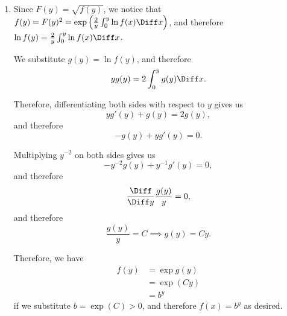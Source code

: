 \begin{enumerate}
    \item Since \(F(y) = \sqrt{f(y)}\), we notice that \(f(y) = F(y)^2 = \exp \left(\frac{2}{y} \int_0^y \ln f(x) \Diff x\right)\), and therefore \(\ln f(y) = \frac{2}{y} \int_0^y \ln f(x) \Diff x\).

          We substitute \(g(y) = \ln f(y)\), and therefore
          \[
              y g(y) = 2 \int_0^y g(y) \Diff x.
          \]

          Therefore, differentiating both sides with respect to \(y\) gives us
          \[
              yg'(y) + g(y) = 2 g(y),
          \]
          and therefore
          \[
              -g(y) + y g'(y) = 0.
          \]

          Multiplying \(y^{-2}\) on both sides gives us
          \[
              -y^{-2}g(y) + y^{-1} g'(y) = 0,
          \]
          and therefore
          \[
              \frac{\Diff}{\Diff y} \frac{g(y)}{y} = 0,
          \]
          and therefore
          \[
              \frac{g(y)}{y} = C \implies g(y) = Cy.
          \]

          Therefore, we have
          \begin{align*}
              f(y) & = \exp g(y) \\
                   & = \exp (Cy) \\
                   & = b^y
          \end{align*}
          if we substitute \(b = \exp(C) > 0\), and therefore \(f(x) = b^y\) as desired.

\end{enumerate}